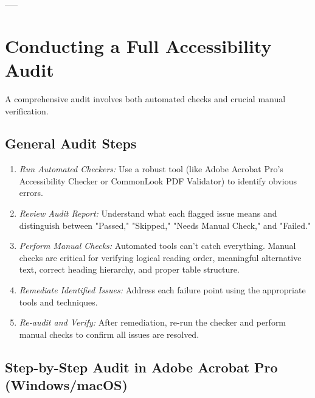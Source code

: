 -----

\section{Conducting a Full Accessibility Audit}
\label{sec:conducting-audit}
A comprehensive audit involves both automated checks and crucial manual verification.

\subsection{General Audit Steps}
\label{subsec:general-audit-steps}

\begin{enumerate}
\item \emph{Run Automated Checkers:} Use a robust tool (like Adobe Acrobat Pro's Accessibility Checker or CommonLook PDF Validator) to identify obvious errors.
\item \emph{Review Audit Report:} Understand what each flagged issue means and distinguish between "Passed," "Skipped," "Needs Manual Check," and "Failed."
\item \emph{Perform Manual Checks:} Automated tools can't catch everything. Manual checks are critical for verifying logical reading order, meaningful alternative text, correct heading hierarchy, and proper table structure.
\item \emph{Remediate Identified Issues:} Address each failure point using the appropriate tools and techniques.
\item \emph{Re-audit and Verify:} After remediation, re-run the checker and perform manual checks to confirm all issues are resolved.
\end{enumerate}

\subsection{Step-by-Step Audit in Adobe Acrobat Pro (Windows/macOS)}
\label{subsec:step-by-step-acrobat}


